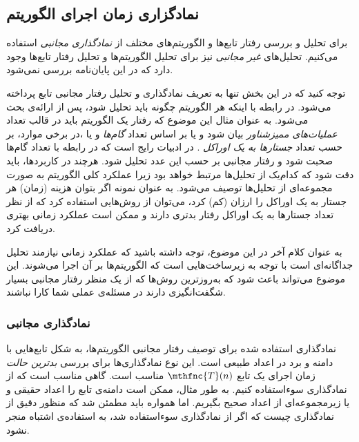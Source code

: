 
%
%
%
%
%
%
%
%
%
%
%
%

\subsection{
نمادگزاری زمان اجرای الگوریتم
\cite{clrs2009}
}
برای تحلیل و بررسی رفتار تابع‌ها و الگوریتم‌های مختلف از
\textit{
نمادگذاری مجانبی
}
استفاده می‌کنیم. تحلیل‌های
\textit{
غیر مجانبی
}
نیز برای تحلیل الگوریتم‌ها و تحلیل رفتار تابع‌ها وجود دارد که در این پایان‌نامه بررسی نمی‌شود.


توجه کنید که در این بخش تنها به تعریف نمادگذاری و تحلیل رفتار مجانبی تابع پرداخته می‌شود. در رابطه با اینکه هر الگوریتم چگونه باید تحلیل شود، پس از ارائه‌ی بحث می‌شود. به عنوان مثال این موضوع که رفتار یک الگوریتم باید در قالب تعداد
\textit{
عملیات‌های ممیزشناور
}
بیان شود و یا بر اساس تعداد
\textit{
گام‌ها
}
و یا ،در برخی موارد، بر حسب تعداد
\textit{
جستارها به یک اوراکل
}.
در ادبیات رایج است که در رابطه با تعداد گام‌ها صحبت شود و رفتار مجانبی بر حسب این عدد تحلیل شود. هرچند در کاربردها، باید دقت شود که کدام‌یک از تحلیل‌ها مرتبط خواهد بود زیرا عملکرد کلی الگوریتم به صورت مجموعه‌ای از تحلیل‌ها توصیف می‌شود. به عنوان نمونه اگر بتوان هزینه (زمان) هر جستار به یک اوراکل را ارزان (کم) کرد، می‌توان از روش‌هایی استفاده کرد که از نظر تعداد جستارها به یک اوراکل رفتار بدتری دارند و ممکن است عملکرد زمانی بهتری دریافت کرد.


به عنوان کلام آخر در این موضوع، توجه داشته باشید که عملکرد زمانی نیازمند تحلیل جداگانه‌ای است با توجه به زیرساخت‌هایی است که الگوریتم‌ها بر آن اجرا می‌شوند. این موضوع می‌تواند باعث شود که به‌روزترین روش‌ها که از یک منظر رفتار مجانبی بسیار شگفت‌انگیزی دارند در مسئله‌ی عملی شما کارا نباشند.


\subsubsection{
نمادگذاری مجانبی
}
نمادگذاری استفاده شده برای توصیف رفتار مجانبی الگوریتم‌ها، به شکل تابع‌هایی با دامنه و برد در اعداد طبیعی است. این نوع نمادگذاری‌ها برای بررسی
\textit{
بدترین حالت
}
زمان اجرای یک تابع
$\mthfnc{T}(n)$
مناسب است. گاهی مناسب است که از نمادگذاری سوءاستفاده کنیم. به طور مثال، ممکن است دامنه‌ی تابع را اعداد حقیقی و یا زیرمجموعه‌ای از اعداد صحیح بگیریم. اما همواره باید مطمئن شد که منظور دقیق از نمادگذاری چیست که اگر از نمادگذاری سوءاستفاده شد، به استفاده‌ی اشتباه منجر نشود.


